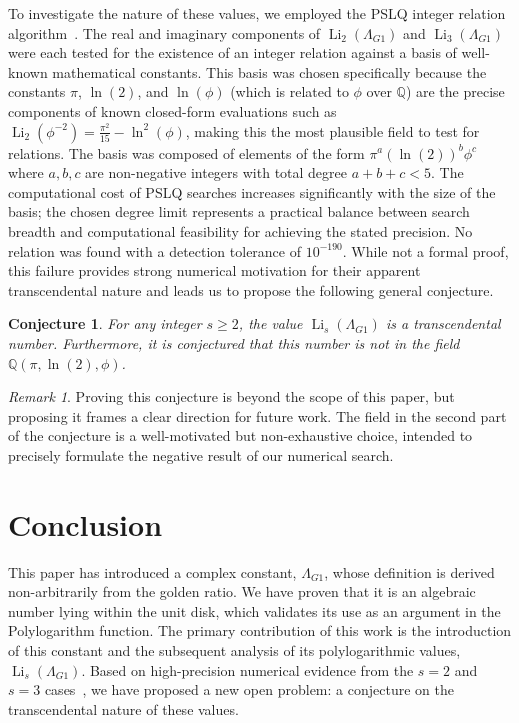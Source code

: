 \documentclass{amsart}
\theoremstyle{plain}
\newtheorem{conjecture}[theorem]{Conjecture}
\theoremstyle{definition}
\theoremstyle{remark}
\newtheorem*{remark}{Remark}
\DeclareMathOperator{\Li}{Li}
\newcommand{\LambdaG}{\Lambda_{G1}}
\newcommand{\phiG}{\phi}
\begin{document}
To investigate the nature of these values, we employed the PSLQ integer relation algorithm~\cite{Bailey2007}. The real and imaginary components of $\Li_2(\LambdaG)$ and $\Li_3(\LambdaG)$ were each tested for the existence of an integer relation against a basis of well-known mathematical constants. This basis was chosen specifically because the constants $\pi$, $\ln(2)$, and $\ln(\phiG)$ (which is related to $\phiG$ over $\mathbb{Q}$) are the precise components of known closed-form evaluations such as $\Li_2(\phiG^{-2}) = \frac{\pi^2}{15} - \ln^2(\phiG)$, making this the most plausible field to test for relations. The basis was composed of elements of the form $\pi^a (\ln(2))^b \phiG^c$ where $a,b,c$ are non-negative integers with total degree $a+b+c < 5$. The computational cost of PSLQ searches increases significantly with the size of the basis; the chosen degree limit represents a practical balance between search breadth and computational feasibility for achieving the stated precision. No relation was found with a detection tolerance of $10^{-190}$. While not a formal proof, this failure provides strong numerical motivation for their apparent transcendental nature and leads us to propose the following general conjecture.

\begin{conjecture}
For any integer $s \ge 2$, the value $\Li_s(\LambdaG)$ is a transcendental number. Furthermore, it is conjectured that this number is not in the field $\mathbb{Q}(\pi, \ln(2), \phiG)$.
\end{conjecture}

\begin{remark}
Proving this conjecture is beyond the scope of this paper, but proposing it frames a clear direction for future work. The field in the second part of the conjecture is a well-motivated but non-exhaustive choice, intended to precisely formulate the negative result of our numerical search.
\end{remark}

\section{Conclusion}
This paper has introduced a complex constant, $\LambdaG$, whose definition is derived non-arbitrarily from the golden ratio. We have proven that it is an algebraic number lying within the unit disk, which validates its use as an argument in the Polylogarithm function. The primary contribution of this work is the introduction of this constant and the subsequent analysis of its polylogarithmic values, $\Li_s(\LambdaG)$. Based on high-precision numerical evidence from the $s=2$ and $s=3$ cases~\cite{mpmath}, we have proposed a new open problem: a conjecture on the transcendental nature of these values.
\end{document}
